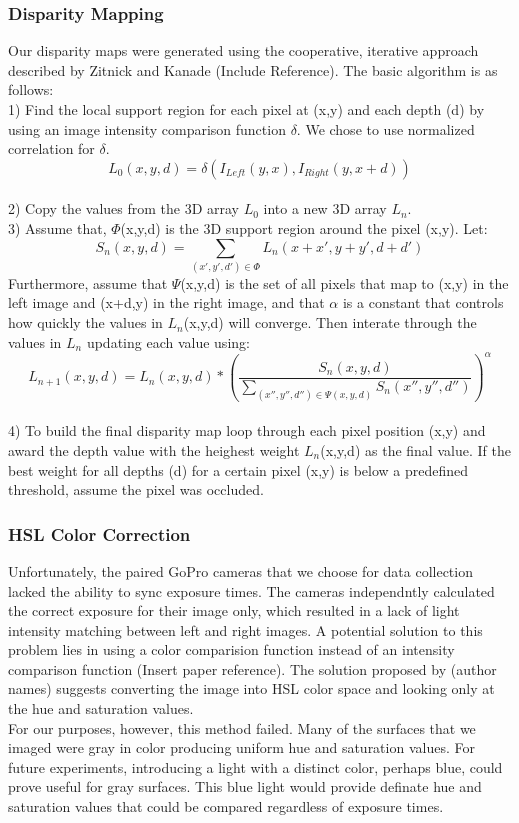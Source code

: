 \documentclass[a4paper,twoside]{article}
\begin{document}
\subsubsection{Disparity Mapping}
\label{subsec:disparity_mapping}
Our disparity maps were generated using the cooperative, iterative approach described by Zitnick and Kanade (Include Reference).  
The basic algorithm is as follows:
\\ 1) Find the local support region for each pixel at (x,y) and each depth (d) by using an image intensity comparison function \(\delta\).  We chose to use normalized correlation for \(\delta\).
\[L_0(x,y,d) = \delta(I_{Left}(y,x),I_{Right}(y,x+d))\]
\\ 2) Copy the values from the 3D array \(L_0\) into a new 3D array \(L_n\).
\\ 3) Assume that, \(\Phi\)(x,y,d) is the 3D support region around the pixel (x,y).
Let: \[S_n(x,y,d) = \sum_{(x',y',d') \in \Phi} L_n (x+x', y+y', d+d') \]
Furthermore, assume that \(\Psi\)(x,y,d) is the set of all pixels that map to (x,y) in the left image and (x+d,y) in the right image, and that \(\alpha\) is a constant that controls how quickly the values in \(L_n\)(x,y,d) will converge.  
Then interate through the values in \(L_n\) updating each value using: 
\[L_{n+1}(x,y,d) = L_n(x,y,d)*\left(  \frac{S_n(x,y,d)}{\sum_{(x'',y'',d'') \in \Psi(x,y,d)} S_n(x'',y'',d'')} \right)^\alpha \]
\\ 4) To build the final disparity map loop through each pixel position (x,y) and award the depth value with the heighest weight \(L_n\)(x,y,d) as the final value.
If the best weight for all depths (d) for a certain pixel (x,y) is below a predefined threshold, assume the pixel was occluded.

\subsubsection{HSL Color Correction}
\label{subsec:hsl_color_correction}
Unfortunately, the paired GoPro cameras that we choose for data collection lacked the ability to sync exposure times.  
The cameras independntly calculated the correct exposure for their image only, which resulted in a lack of light intensity matching between left and right images.
A potential solution to this problem lies in using a color comparision function instead of an intensity comparison function (Insert paper reference).  
The solution proposed by (author names) suggests converting the image into HSL color space and looking only at the hue and saturation values.  
\\ 
For our purposes, however, this method failed.  
Many of the surfaces that we imaged were gray in color producing uniform hue and saturation values.
For future experiments, introducing a light with a distinct color, perhaps blue, could prove useful for gray surfaces.  
This blue light would provide definate hue and saturation values that could be compared regardless of exposure times.
\end{document}
